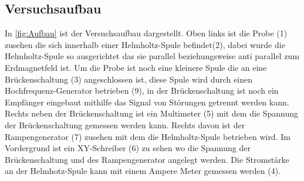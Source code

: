 \subsection{Versuchsaufbau}

In \cref{fig:Aufbau} ist der Versuchsaufbau dargestellt. Oben links ist die Probe (1) zusehen die sich innerhalb einer Helmholtz-Spule befindet(2), dabei wurde die Helmholtz-Spule so ausgerichtet das sie parallel beziehungsweise anti parallel zum Erdmagnetfeld ist. Um die Probe ist noch eine kleinere Spule die an eine Brückenschaltung (3) angeschlossen ist, diese Spule wird durch einen Hochfrequenz-Generator betrieben (9), in der Brückenschaltung ist noch ein Empfänger eingebaut mithilfe das Signal von Störungen getrennt werden kann. Rechts neben der Brückenschaltung ist ein Multimeter (5) mit dem die Spannung der Brückenschaltung gemessen werden kann. Rechts davon ist der Rampengenerator (7) zusehen mit dem die Helmholtz-Spule betrieben wird. Im Vordergrund ist ein XY-Schreiber (6) zu sehen wo die Spannung der Brückenschaltung und des Rampengenerator angelegt werden. Die Stromstärke an der Helmhotz-Spule kann mit einem Ampere Meter gemessen werden (4).
